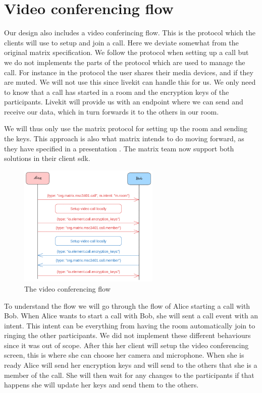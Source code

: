 \documentclass{report}
\begin{document}
\section{Video conferencing flow}
Our design also includes a video conferincing flow. This is the protocol which the clients will use to setup and
join a call. Here we deviate somewhat from the original matrix specification. We follow the protocol when setting up a
call but we do not implements the parts of the protocol which are used to manage the call. For instance in the protocol
the user shares their media devices, and if they are muted. We will not use this since livekit can handle this for
us. We only need to know that a call has started in a room and the encryption keys of the participants. Livekit will
provide us with an endpoint where we can send and receive our data, which in turn forwards it to the others in our room.

We will thus only use the matrix protocol for setting up the room and sending the keys. This approach is also what
matrix intends to do moving forward, as they have specified in a presentation . The matrix
team now support both solutions in their client sdk.

\begin{figure}
\centering
\includegraphics[width=0.6\textwidth]{img/Callflow.excalidraw.png}
\caption{The video conferencing flow}
\label{fig:video-conference-flow}
\end{figure}

To understand the flow we will go through the flow of Alice starting a call with Bob.
When Alice wants to start a call with Bob, she will sent a call event with an intent. This intent can be
everything from having the room automatically join to ringing the other participants. We did not implement
these different behaviours since it was out of scope. After this her client will setup the video conferencing
screen, this is where she can choose her camera and microphone. When she is ready Alice will send her encryption
keys and will send to the others that she is a member of the call. She will then wait for any changes to the
participants
if that happens she will update her keys and send them to the others.
\end{document}
